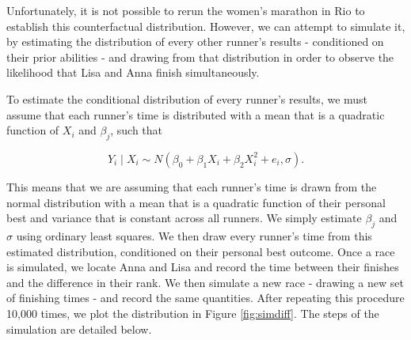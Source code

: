 \documentclass[12pt,titlepage]{article}
\begin{document}
Unfortunately, it is not possible to rerun the women's marathon in Rio to establish this counterfactual distribution.  However, we can attempt to simulate it, by estimating the distribution of every other runner's results -  conditioned on their prior abilities - and drawing from that distribution in order to observe the likelihood that Lisa and Anna finish simultaneously.  

To estimate the conditional distribution of every runner's results, we must assume that each runner's time is distributed with a mean that is a quadratic function of $X_i$  and $\beta_j$, such that

$$Y_i \mid X_i \sim N(\beta_0 + \beta_1X_{i} + \beta_2X^2_{i}  + e_i, \sigma).$$

This means that we are assuming that each runner's time is drawn from the normal distribution with a mean that is a quadratic function of their personal best and variance that is constant across all runners.  We simply estimate $\beta_j$ and $\sigma$ using ordinary least squares.  We then draw every runner's time from this estimated distribution, conditioned on their personal best outcome.  Once a race is simulated, we locate Anna and Lisa and record the time between their finishes and the difference in their rank.  We then simulate a new race - drawing a new set of finishing times - and record the same quantities.  After repeating this procedure 10,000 times, we plot the distribution in Figure \ref{fig:simdiff}.  The steps of the simulation are detailed below.
\end{document}
